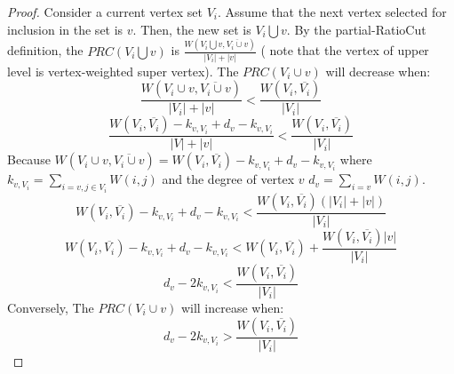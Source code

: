 \documentclass{acm_proc_article-sp}
\begin{document}
\begin{proof}
 Consider a current vertex set $V_{i}$. Assume that the next vertex selected for inclusion in the set is $v$. Then, the new set is $V_{i}\bigcup{v}$. By the partial-RatioCut definition, the $PRC(V_{i}\bigcup{v})$ is $\frac{W(V_{i}\bigcup{v},\overline{V_{i}\cup{v}})}{|V_{i}|+|v|}$ ( note that the vertex of upper level is vertex-weighted super vertex). The $PRC(V_{i}\cup{v})$ will decrease when:
 \begin{displaymath}
\frac{W(V_{i}\cup{v},\overline{V_{i}\cup {v}})}{|V_{i}|+|v|}< \frac{W(V_{i},\overline{V_{i}})}{|V_{i}|}
\end{displaymath}
 \begin{displaymath}
\frac{W(V_{i},\overline{V_{i}})-k_{v,V_{i}}+d_{v}-k_{v,V_{i}}}{|V|+|v|}< \frac{W(V_{i},\overline{V_{i}})}{|V_{i}|}
\end{displaymath}
Because $W(V_{i}\cup{v},\overline{V_{i}\cup{v}})=W(V_{i},\overline {V_{i}})-k_{v,V_{i}}+d_{v}-k_{v,V_{i}}$ where $k_{v,V_{i}}=\sum_{i=v,j\in V_{i}}W(i,j)$ and the degree of vertex $v$ $d_{v}=\sum_{i=v}W(i,j)$.
 \begin{displaymath}
W(V_{i},\overline {V_{i}})-k_{v,V_{i}}+d_{v}-k_{v,V_{i}}<\frac{W(V_{i},\overline{V_{i}})(|V_{i}|+|v|)}{|V_{i}|}
\end{displaymath}
 \begin{displaymath}
W(V_{i},\overline {V_{i}})-k_{v,V_{i}}+d_{v}-k_{v,V_{i}}<W(V_{i},\overline{V_{i}})+\frac{W(V_{i},\overline{V_{i}})|v|}{|V_{i}|}
\end{displaymath}
 \begin{displaymath}
d_{v}-2k_{v,V_{i}}<\frac{W(V_{i},\overline{V_{i}})}{|V_{i}|}
\end{displaymath}
Conversely, The $PRC(V_{i}\cup{v})$ will increase when:
 \begin{displaymath}
d_{v}-2k_{v,V_{i}}>\frac{W(V_{i},\overline{V_{i}})}{|V_{i}|}
\end{displaymath}
\end{proof}
\end{document}
